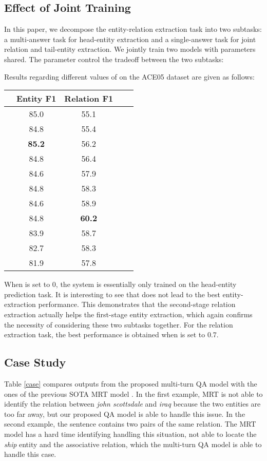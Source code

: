\documentclass[11pt,a4paper]{article}
\begin{document}
\subsection{Effect of Joint Training}


In this paper, we decompose the entity-relation extraction task into two subtasks:  a multi-answer task for  head-entity extraction  
 and a single-answer task for joint relation and tail-entity extraction. 
 We jointly train two models with parameters shared. 
 The parameter  control the tradeoff between the two subtasks:
  
Results regarding different values of  on the ACE05 dataset are 
given as follows: 
\begin{center}
\small
\begin{tabular}{ccccl}\hline
{\bf }&{\bf Entity F1}&{\bf Relation F1}\\\hline
& 85.0&55.1 \\
& 84.8&55.4 \\
& {\bf 85.2}&56.2 \\
& 84.8&56.4 \\
& 84.6&57.9 \\
& 84.8&58.3 \\
& 84.6&58.9 \\
& 84.8&{\bf 60.2} \\
& 83.9&58.7 \\
& 82.7&58.3 \\
& 81.9&57.8 \\\hline
\end{tabular}
\end{center}


When  is set to 0, the system is essentially only trained on the head-entity prediction task. 
It is interesting to see that  does not lead to the best entity-extraction performance. 
This demonstrates that the second-stage relation extraction actually helps the first-stage entity extraction, which again confirms the necessity of considering these two subtasks together. 
For the relation extraction task, the best performance is obtained when  is set to 0.7.

\subsection{Case Study}
Table \ref{case} compares outputs from the proposed multi-turn QA model with the ones of the previous SOTA MRT model \cite{sun2018extracting}. 
In the first example, MRT is not able to identify the relation between {\it john scottsdale} and {\it iraq} because the two entities are too far away, but our proposed QA model is able to handle this issue.
In the second example, the sentence contains two pairs of the same relation. The MRT model has a hard time identifying handling this situation, not able to locate the {\it ship} entity and the associative relation, which the multi-turn QA model is able to  handle this case. 
\end{document}

